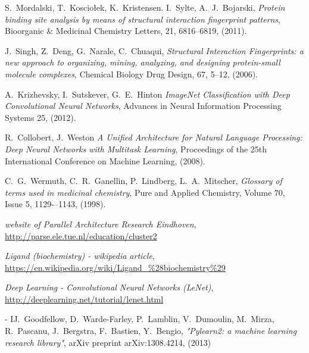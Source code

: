 \documentclass[a4paper,10pt]{report}
\begin{document}
\begin{thebibliography}{99}
      S.~Mordalski, T.~Kosciołek, K.~Kristensen. I.~Sylte, A.~J.~Bojarski,
      \textit{Protein binding site analysis by means of structural interaction fingerprint patterns},
      Bioorganic \& Medicinal Chemistry Letters, 21, 6816--6819,
      (2011).

      J.~Singh, Z.~Deng, G.~Narale, C.~Chuaqui,
      \textit{Structural Interaction Fingerprints: a new approach to organizing, mining, analyzing, and designing protein-small molecule complexes},
      Chemical Biology Drug Design, 67, 5--12,
      (2006).
      
      A.~Krizhevsky, I.~Sutskever, G.~E.~Hinton
      \textit{ImageNet Classification with Deep Convolutional Neural Networks},
      Advances in Neural Information Processing Systems 25,
      (2012).

      R.~Collobert, J.~Weston
      \textit{A Unified Architecture for Natural Language Processing: Deep Neural Networks with Multitask Learning},
      Proceedings of the 25th International Conference on Machine Learning,
      (2008).
      
      C.~G.~Wermuth, C.~R.~Ganellin, P.~Lindberg, L.~A.~Mitscher,
      \textit{Glossary of terms used in medicinal chemistry},
      Pure and Applied Chemistry, Volume 70, Issue 5, 1129-–1143,
      (1998).
      
      \textit{website of Parallel Architecture Research Eindhoven},
      \url{http://parse.ele.tue.nl/education/cluster2}

      \textit{Ligand (biochemistry) - wikipedia article},
      \url{https://en.wikipedia.org/wiki/Ligand_%28biochemistry%29}
     
      \textit{Deep Learning - Convolutional Neural Networks (LeNet)},
      \url{http://deeplearning.net/tutorial/lenet.html}

      
      - IJ.~Goodfellow, D.~Warde-Farley, P.~Lamblin, V.~Dumoulin, M.~Mirza, R.~Pascanu, J.~Bergstra, F.~Bastien, Y.~Bengio,
      \textit{"Pylearn2: a machine learning research library"},
     arXiv preprint arXiv:1308.4214,
     (2013)
  

      
    
  \end{thebibliography}
  
    
\end{document}
